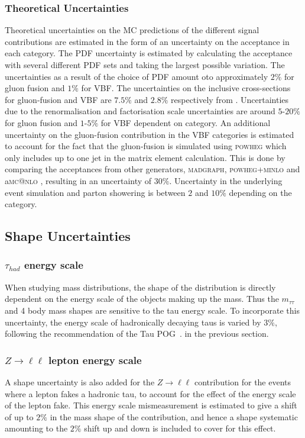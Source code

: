 \subsubsection{\textbf{Theoretical Uncertainties}} 
Theoretical uncertainties on the \ac{MC} predictions of the different signal
contributions are estimated in the form of an uncertainty on the acceptance in
each category. The \ac{PDF} uncertainty is estimated by calculating the
acceptance with several different \ac{PDF} sets and taking the largest possible
variation. The uncertainties as a result of the choice of \ac{PDF} amount oto
approximately $2\%$ for gluon fusion and $1\%$ for \ac{VBF}. The uncertainties
on the inclusive cross-sections for gluon-fusion and \ac{VBF} are $7.5\%$ and
$2.8\%$ respectively from
\cite{LHCHiggsCrossSectionWorkingGroup:2011ti,Dittmaier:2012vm,Heinemeyer:2013tqa}.
Uncertainties due to the renormalisation and factorisation scale uncertainties
are around $5$-$20\%$ for gluon fusion and $1$-$5\%$ for \ac{VBF} dependent on
category. An additional uncertainty on the gluon-fusion contribution in the
VBF categories is estimated to account for the fact that the gluon-fusion is
simulated using \textsc{powheg} which only includes up to one jet in the matrix
element calculation. This is done by comparing the acceptances from other
generators, \textsc{madgraph}, \textsc{powheg+minlo} \cite{Hamilton:2012np} and
a\textsc{mc@nlo} \cite{Frixione:2002ik}, resulting in an uncertainty of $30\%$.
Uncertainty in the underlying event simulation and parton showering is between
$2$ and $10\%$ depending on the category. 


\subsection{Shape Uncertainties}
\label{sec:systematicUncertainties_yield}

\subsubsection{$\tau_{had}$ energy scale} 
When studying mass distributions, the shape of the distribution is directly
dependent on the energy scale of the objects making up the mass. Thus the
$m_{\tau\tau}$ and 4 body mass shapes are sensitive to the tau energy scale.
To incorporate this uncertainty, the energy scale of hadronically decaying taus is varied by $3\%$,
following the recommendation of the Tau POG~\cite{TauIDRecommendation}. 
in the previous section.

\subsubsection{\textbf{$Z \to \ell\ell$ lepton energy scale}}
A shape uncertainty is also added for the $Z \to \ell\ell$ contribution for the
events where a lepton fakes a hadronic tau, to account for the effect of the energy 
scale of the lepton fake. This energy scale mismeasurement is estimated to give a 
shift of up to $2\%$ in the mass shape of the contribution, and hence a shape systematic amounting to the
$2\%$ shift up and down is included to cover for this effect.

